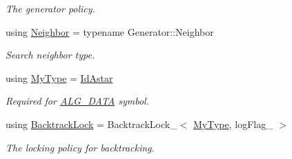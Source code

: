 \begin{DoxyCompactItemize}
\begin{DoxyCompactList}\small\item\em The generator policy. \end{DoxyCompactList}\item 
using \hyperlink{structslb_1_1ext_1_1algorithm_1_1IdAstar_a8c382f5126c7c1038ecd676e75e174db}{Neighbor} = typename Generator\+::\+Neighbor\hypertarget{structslb_1_1ext_1_1algorithm_1_1IdAstar_a8c382f5126c7c1038ecd676e75e174db}{}\label{structslb_1_1ext_1_1algorithm_1_1IdAstar_a8c382f5126c7c1038ecd676e75e174db}

\begin{DoxyCompactList}\small\item\em Search neighbor type. \end{DoxyCompactList}\item 
using \hyperlink{structslb_1_1ext_1_1algorithm_1_1IdAstar_ad4e2a7d07a9256a0973ed8ee0b6b6136}{My\+Type} = \hyperlink{structslb_1_1ext_1_1algorithm_1_1IdAstar}{Id\+Astar}\hypertarget{structslb_1_1ext_1_1algorithm_1_1IdAstar_ad4e2a7d07a9256a0973ed8ee0b6b6136}{}\label{structslb_1_1ext_1_1algorithm_1_1IdAstar_ad4e2a7d07a9256a0973ed8ee0b6b6136}

\begin{DoxyCompactList}\small\item\em Required for \hyperlink{algorithm_8h_a64c012078deee9a30405e18ec11e6360}{A\+L\+G\+\_\+\+D\+A\+TA} symbol. \end{DoxyCompactList}\item 
using \hyperlink{structslb_1_1ext_1_1algorithm_1_1IdAstar_a0337b9a42a8431c19a948905c996ee6c}{Backtrack\+Lock} = Backtrack\+Lock\+\_\+$<$ \hyperlink{structslb_1_1ext_1_1algorithm_1_1IdAstar_ad4e2a7d07a9256a0973ed8ee0b6b6136}{My\+Type}, log\+Flag\+\_\+ $>$\hypertarget{structslb_1_1ext_1_1algorithm_1_1IdAstar_a0337b9a42a8431c19a948905c996ee6c}{}\label{structslb_1_1ext_1_1algorithm_1_1IdAstar_a0337b9a42a8431c19a948905c996ee6c}

\begin{DoxyCompactList}\small\item\em The locking policy for backtracking. \end{DoxyCompactList}\end{DoxyCompactItemize}
